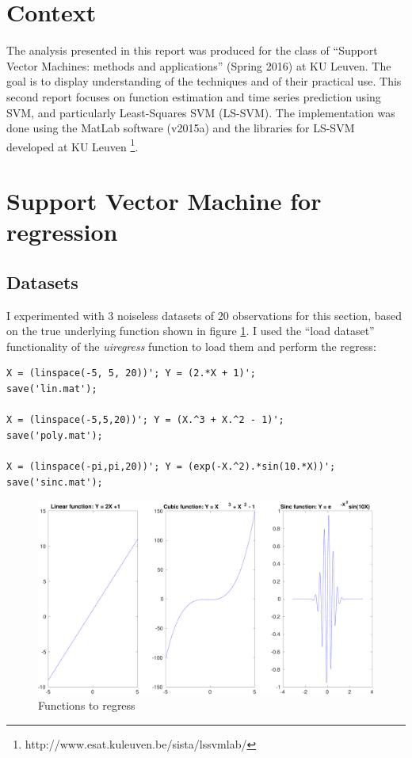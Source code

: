 \documentclass[11pt, a4paper]{article}
\begin{document}

\tableofcontents
\newpage

\section*{Context}

The analysis presented in this report was produced for the class of
``Support Vector Machines: methods and applications'' (Spring 2016) at
KU Leuven. The goal is to display understanding of the techniques and
of their practical use. This second report focuses on function
estimation and time series prediction using SVM, and particularly
Least-Squares SVM (LS-SVM). The implementation was done using the
MatLab software (v2015a) and the libraries for LS-SVM developed at KU
Leuven \footnote{http://www.esat.kuleuven.be/sista/lssvmlab/}.

\section{Support Vector Machine for regression}

\subsection{Datasets}
I experimented with 3 noiseless datasets of 20 observations for this
section, based on the true underlying function shown in figure
\ref{fig:regress_datasets}. I used the ``load dataset'' functionality
of the \emph{uiregress} function to load them and perform the regress:

\begin{lstlisting}
X = (linspace(-5, 5, 20))'; Y = (2.*X + 1)';
save('lin.mat');

X = (linspace(-5,5,20))'; Y = (X.^3 + X.^2 - 1)';
save('poly.mat');

X = (linspace(-pi,pi,20))'; Y = (exp(-X.^2).*sin(10.*X))';
save('sinc.mat');
\end{lstlisting}

\begin{figure}[H]
    \centering
    \includegraphics[scale=.30]{datasets.pdf}
    \caption{Functions to regress}
    \label{fig:regress_datasets}
\end{figure}
\end{document}
